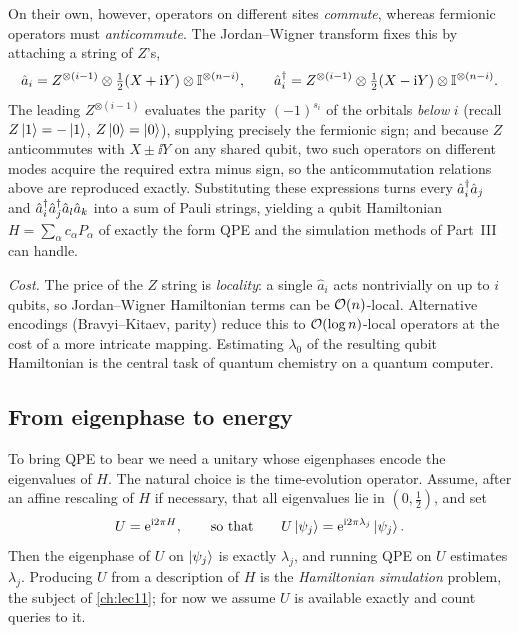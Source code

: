 \begin{example}
On their own, however, operators on
different sites \emph{commute}, whereas fermionic operators must \emph{anticommute}.
The Jordan--Wigner transform fixes this by attaching a string of $Z$'s,
\[
  \hat a_i= Z^{\otimes(i-1)}\otimes\tfrac12(X+\mathrm{i} Y)\otimes\mathbb{I}^{\otimes(n-i)},
  \qquad
  \hat a_i^{\dagger}= Z^{\otimes(i-1)}\otimes\tfrac12(X-\mathrm{i} Y)\otimes\mathbb{I}^{\otimes(n-i)}.
\]
The leading $Z^{\otimes(i-1)}$ evaluates the parity $(-1)^{s_i}$ of the orbitals
\emph{below} $i$ (recall $Z\ket1=-\ket1$, $Z\ket0=\ket0$), supplying precisely the
fermionic sign; and because $Z$ anticommutes with $X\pm\ii Y$ on any shared qubit,
two such operators on different modes acquire the required extra minus sign, so the
anticommutation relations above are reproduced exactly. Substituting these
expressions turns every $\hat a_i^{\dagger}\hat a_j$ and $\hat a_i^{\dagger}\hat a_j^{\dagger}\hat a_l\hat
a_k$ into a sum of Pauli strings, yielding a qubit Hamiltonian
$H=\sum_\alpha c_\alpha P_\alpha$ of exactly the form QPE and the simulation methods
of Part~III can handle.

\emph{Cost.} The price of the $Z$ string is \emph{locality}: a single $\hat a_i$ acts
nontrivially on up to $i$ qubits, so Jordan--Wigner Hamiltonian terms can be
$\mathcal{O}(n)$-local. Alternative encodings (Bravyi--Kitaev, parity) reduce this to
$\mathcal{O}(\log n)$-local operators at the cost of a more intricate mapping. Estimating
$\lambda_0$ of the resulting qubit Hamiltonian is the central task of quantum
chemistry on a quantum computer.
\end{example}

\subsection*{From eigenphase to energy}

To bring QPE to bear we need a unitary whose eigenphases encode the eigenvalues of
$H$. The natural choice is the time-evolution operator. Assume, after an affine
rescaling of $H$ if necessary, that all eigenvalues lie in $(0,\tfrac12)$, and set
\begin{equation}
  U=\mathrm{e}^{\mathrm{i} 2\pi H},\qquad\text{so that}\qquad
  U\ket{\psi_j}=\mathrm{e}^{\mathrm{i} 2\pi\lambda_j}\ket{\psi_j}.
  \label{eq:lec05-Uexp}
\end{equation}
Then the eigenphase of $U$ on $\ket{\psi_j}$ is exactly $\lambda_j$, and running
QPE on $U$ estimates $\lambda_j$. Producing $U$ from a description of $H$ is the
\emph{Hamiltonian simulation} problem, the subject of \cref{ch:lec11}; for now we
assume $U$ is available exactly and count queries to it.

